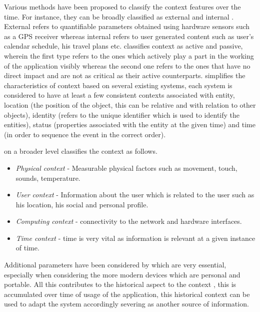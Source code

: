 \documentclass[12pt]{report}
\begin{document}
Various methods have been proposed to classify the context features over the time. For instance, they can be broadly classified as external and internal \cite{gustavsen2002condor}. External refers to quantifiable parameters obtained using hardware sensors such as a GPS receiver whereas internal refers to user generated content such as user's calendar schedule, his travel plans etc. \cite{chen2000survey} classifies context as active and passive, wherein the first type refers to the ones which actively play a part in the working of the application visibly whereas the second one refers to the ones that have no direct impact and are not as critical as their active counterparts. \cite{abowd1999towards} simplifies the characteristics of context based on several existing systems, each system is considered to have at least a few consistent contexts associated with entity, location (the position of the object, this can be relative and with relation to other objects), identity (refers to the unique identifier which is used to identify the entities), status (properties associated with the entity at the given time) and time (in order to sequence the event in the correct order).

\cite{schilit1994context} on a broader level classifies the context as follows.
\begin{itemize}
	\item \textit{Physical context} - Measurable physical factors such as movement, touch, sounds, temperature.
	\item \textit{User context} - Information about the user which is related to the user such as his location, his social and personal profile.
	\item \textit{Computing context} - connectivity to the network and hardware interfaces.
	\item \textit{Time context} - time is very vital as information is relevant at a given instance of time.
\end{itemize}

Additional parameters have been considered by \cite{chen2000survey} which are very essential, especially when considering the more modern devices which are personal and portable. All this contributes to the historical aspect to the context \cite{chen2000survey}, this is accumulated over time of usage of the application, this historical context can be used to adapt the system accordingly severing as another source of information.
\end{document}

